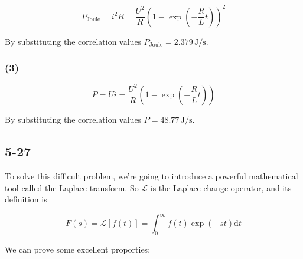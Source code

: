 \documentclass[a4paper,11pt]{amsart}
\theoremstyle{definition}
\begin{document}
	$$
	P_{\mathrm{Joule}}=i^2R=\frac{U^2}{R}\left( 1-\exp \left( -\frac{R}{L}t \right) \right) ^2
	$$
	
	By substituting the correlation values $\displaystyle P_\mathrm{Joule}=2.379\,\mathrm{J/s}$.
	
	\subsubsection*{(3)}
	
	$$
	P=Ui=\frac{U^2}{R}\left( 1-\exp \left( -\frac{R}{L}t \right) \right) 
	$$
	
	By substituting the correlation values $\displaystyle P=48.77\,\mathrm{J/s}$.
	
	\subsection*{5-27}
	
	To solve this difficult problem, we're going to introduce a powerful mathematical tool called the Laplace transform. So $\mathscr{L} $ is the Laplace change operator, and its definition is
	
	$$
	F\left( s \right) =\mathscr{L} \left[ f\left( t \right) \right] =\int_0^{\infty}{f\left( t \right) \exp \left( -st \right) \mathrm{d}t}
	$$
	
	We can prove some excellent proporties:
	
\end{document}
